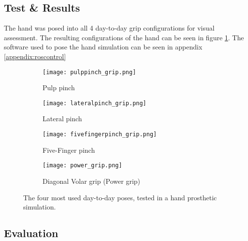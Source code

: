 \documentclass[../main.tex]{subfiles}
\begin{document}
\subsection{Test \& Results}

The hand was posed into all 4 day-to-day grip configurations for visual assessment.
The resulting configurations of the hand can be seen in figure  \ref{fig:hand_pose_test}.
The software used to pose the hand simulation can be seen in appendix \ref{appendix:roscontrol} 

\begin{figure}
    \centering
    \begin{subfigure}[b]{0.49\textwidth}
        \centering
        \texttt{[image: pulppinch\_grip.png]}
        \caption{Pulp pinch}
    \end{subfigure}
    \hfill
    \centering
    \begin{subfigure}[b]{0.49\textwidth}
        \centering
        \texttt{[image: lateralpinch\_grip.png]}
        \caption{Lateral pinch}
    \end{subfigure}
    \hfill
    \begin{subfigure}[b]{0.49\textwidth}
        \centering
        \texttt{[image: fivefingerpinch\_grip.png]}
        \caption{Five-Finger pinch}
    \end{subfigure}
    \hfill
    \begin{subfigure}[b]{0.49\textwidth}
        \centering
        \texttt{[image: power\_grip.png]}
        \caption{Diagonal Volar grip (Power grip)}
    \end{subfigure}
    \caption{The four most used day-to-day poses, tested in a hand prosthetic simulation.}
    \label{fig:hand_pose_test}
\end{figure}



\subsection{Evaluation}
\end{document}
